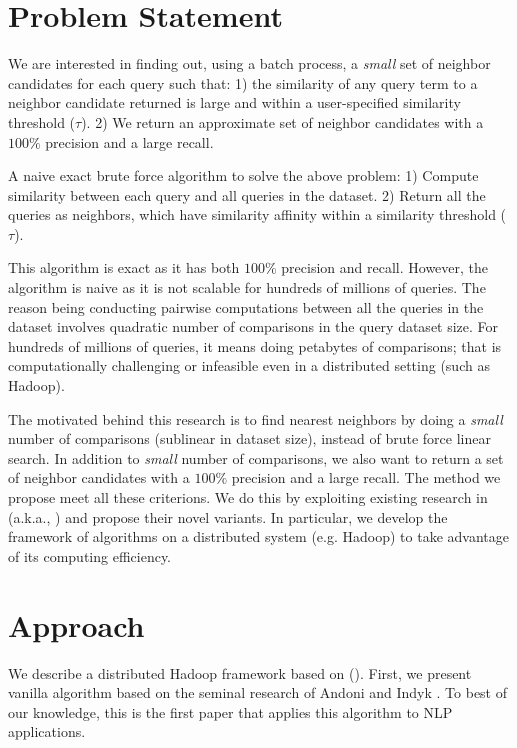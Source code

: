 
\section{Problem Statement}
We are interested in finding out, using a batch process, a \emph{small} set of
neighbor candidates for each query such that: 1) the similarity of any 
query term to a neighbor candidate returned is large and within a user-specified 
similarity threshold ($\tau$). 2) We return an approximate set of neighbor 
candidates with a $100\%$ precision and a large recall. 

A naive exact brute force algorithm to solve the above problem: 
1) Compute similarity between each query and all queries in the dataset. 
2) Return all the queries as neighbors, which have similarity affinity within a similarity threshold ($\tau$). 

This algorithm is exact as it has both $100\%$ precision and recall. 
However, the algorithm is naive as it is not scalable for hundreds of millions of queries. 
The reason being conducting pairwise computations between all the queries in the dataset involves 
quadratic number of comparisons in the query dataset size. 
For hundreds of millions of queries, it means doing petabytes of comparisons; 
that is  computationally challenging or infeasible even in a distributed setting (such as Hadoop).   

The motivated behind this research is to find nearest neighbors by doing a 
\emph{small} number of comparisons (sublinear in dataset size), instead of brute force linear search. 
In addition to \emph{small} number of comparisons, we also want to 
return a set of neighbor candidates with a $100\%$ precision and a large recall. 
The method we propose meet all these criterions. We do this by exploiting 
existing research in \lshf (a.k.a., \lsh) and propose their novel variants. 
In particular, we develop the framework of  \lsh algorithms on a distributed 
system (e.g. Hadoop) to take advantage of its computing efficiency.



\section{Approach}
\label{sec:approach}
We describe a distributed Hadoop framework based on \lshf (\lsh). 
First, we present vanilla \lsh algorithm based on the seminal research of Andoni and Indyk  . To best of our knowledge, this is the first paper that applies this algorithm to NLP applications. 

